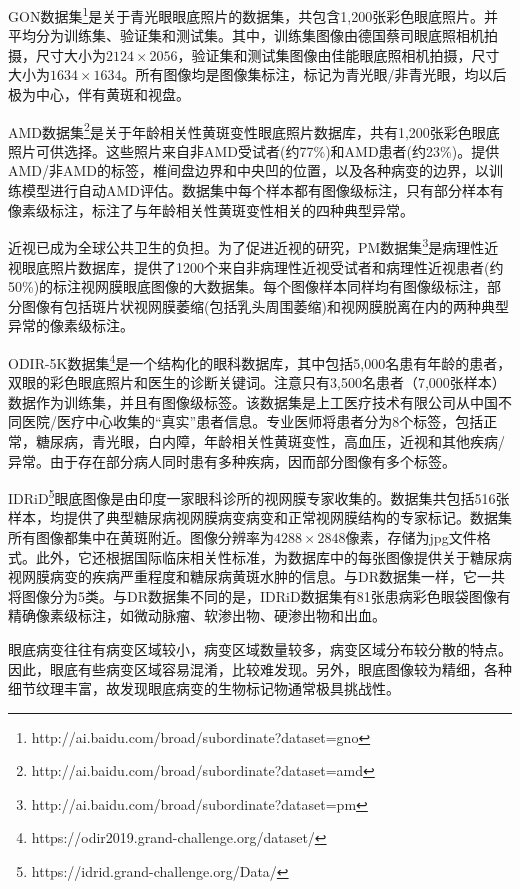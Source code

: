 GON数据集\footnote{http://ai.baidu.com/broad/subordinate?dataset=gno}是关于青光眼眼底照片的数据集，共包含1,200张彩色眼底照片。并平均分为训练集、验证集和测试集。其中，训练集图像由德国蔡司眼底照相机拍摄，尺寸大小为$2124\times 2056$，验证集和测试集图像由佳能眼底照相机拍摄，尺寸大小为$1634\times 1634 $。所有图像均是图像集标注，标记为青光眼/非青光眼，均以后极为中心，伴有黄斑和视盘。

AMD数据集\footnote{http://ai.baidu.com/broad/subordinate?dataset=amd}是关于年龄相关性黄斑变性眼底照片数据库，共有1,200张彩色眼底照片可供选择。这些照片来自非AMD受试者(约77\%)和AMD患者(约23\%)。提供AMD/非AMD的标签，椎间盘边界和中央凹的位置，以及各种病变的边界，以训练模型进行自动AMD评估。数据集中每个样本都有图像级标注，只有部分样本有像素级标注，标注了与年龄相关性黄斑变性相关的四种典型异常。

近视已成为全球公共卫生的负担。为了促进近视的研究，PM数据集\footnote{http://ai.baidu.com/broad/subordinate?dataset=pm}是病理性近视眼底照片数据库，提供了1200个来自非病理性近视受试者和病理性近视患者(约50\%)的标注视网膜眼底图像的大数据集。每个图像样本同样均有图像级标注，部分图像有包括斑片状视网膜萎缩(包括乳头周围萎缩)和视网膜脱离在内的两种典型异常的像素级标注。

ODIR-5K数据集\footnote{https://odir2019.grand-challenge.org/dataset/}是一个结构化的眼科数据库，其中包括5,000名患有年龄的患者，双眼的彩色眼底照片和医生的诊断关键词。注意只有3,500名患者（7,000张样本）数据作为训练集，并且有图像级标签。该数据集是上工医疗技术有限公司从中国不同医院/医疗中心收集的“真实”患者信息。专业医师将患者分为8个标签，包括正常，糖尿病，青光眼，白内障，年龄相关性黄斑变性，高血压，近视和其他疾病/异常。由于存在部分病人同时患有多种疾病，因而部分图像有多个标签。

IDRiD\footnote{https://idrid.grand-challenge.org/Data/}眼底图像是由印度一家眼科诊所的视网膜专家收集的。数据集共包括516张样本，均提供了典型糖尿病视网膜病变病变和正常视网膜结构的专家标记。数据集所有图像都集中在黄斑附近。图像分辨率为$4288\times 2848$像素，存储为jpg文件格式。此外，它还根据国际临床相关性标准，为数据库中的每张图像提供关于糖尿病视网膜病变的疾病严重程度和糖尿病黄斑水肿的信息。与DR数据集一样，它一共将图像分为5类。与DR数据集不同的是，IDRiD数据集有81张患病彩色眼袋图像有精确像素级标注，如微动脉瘤、软渗出物、硬渗出物和出血。

眼底病变往往有病变区域较小，病变区域数量较多，病变区域分布较分散的特点。因此，眼底有些病变区域容易混淆，比较难发现。另外，眼底图像较为精细，各种细节纹理丰富，故发现眼底病变的生物标记物通常极具挑战性。

